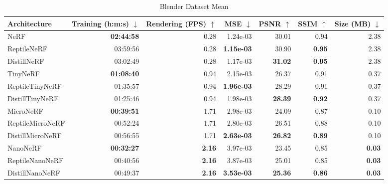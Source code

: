 \begin{table}[ht]
    \centering
    \begin{tabular*}{\textwidth}{l @{\extracolsep{\fill}} rrrrrr}
        \toprule
        \textbf{Architecture} &
        \textbf{Training (h:m:s)} $\downarrow$ &
        \textbf{Rendering (FPS)} $\uparrow$ &
        \textbf{MSE} $\downarrow$ &
        \textbf{PSNR} $\uparrow$ &
        \textbf{SSIM} $\uparrow$ &
        \textbf{Size (MB)} $\downarrow$ \\
        \midrule
        NeRF             & \textbf{02:44:58} &         0.28  &         1.24e-03  &         30.01  &         0.94  &         2.38  \\
        ReptileNeRF      &         03:59:56  &         0.28  & \textbf{1.15e-03} &         30.90  & \textbf{0.95} &         2.38  \\
        DistillNeRF      &         03:02:49  &         0.28  &         1.17e-03  & \textbf{31.02} & \textbf{0.95} &         2.38  \\
        \midrule
        TinyNeRF         & \textbf{01:08:40} &         0.94  &         2.15e-03  &         26.37  &         0.91  &         0.37  \\
        ReptileTinyNeRF  &         01:35:57  &         0.94  & \textbf{1.96e-03} &         28.29  &         0.91  &         0.37  \\
        DistillTinyNeRF  &         01:25:46  &         0.94  &         1.98e-03  & \textbf{28.39} & \textbf{0.92} &         0.37  \\
        \midrule
        MicroNeRF        & \textbf{00:39:51} &         1.71  &         2.98e-03  &         24.09  &         0.87  &         0.10  \\
        ReptileMicroNeRF &         00:52:24  &         1.71  &         2.80e-03  &         26.51  &         0.88  &         0.10  \\
        DistillMicroNeRF &         00:56:55  &         1.71  & \textbf{2.63e-03} & \textbf{26.82} & \textbf{0.89} &         0.10  \\
        \midrule
        NanoNeRF         & \textbf{00:32:27} & \textbf{2.16} &         3.97e-03  &         23.45  &         0.85  & \textbf{0.03} \\
        ReptileNanoNeRF  &         00:40:56  & \textbf{2.16} &         3.87e-03  &         25.01  &         0.85  & \textbf{0.03} \\
        DistillNanoNeRF  &         00:49:37  & \textbf{2.16} & \textbf{3.53e-03} & \textbf{25.36} & \textbf{0.86} & \textbf{0.03} \\
        \bottomrule
    \end{tabular*}
    \caption{Blender Dataset Mean}
    \label{tab:results}
\end{table}

